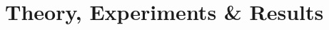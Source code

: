 \documentclass[handout]{beamer}\mode<handout>{\usetheme{AMSBolognaFC}}
\begin{document}

\section{Theory, Experiments \& Results}
\end{document}
